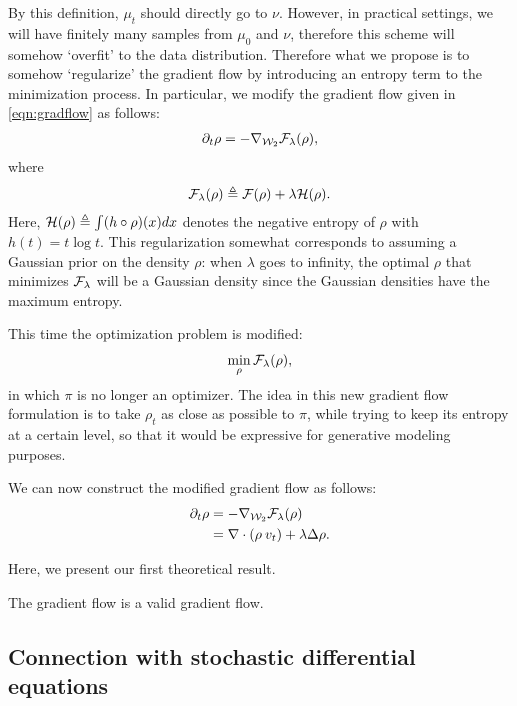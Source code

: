 By this definition, $\mu_t$ should directly go to $\nu$. However, in practical settings, we will have finitely many samples from $\mu_0$ and $\nu$, therefore this scheme will somehow `overfit' to the data distribution. Therefore what we propose is to somehow `regularize' the gradient flow by introducing an entropy term to the minimization process. In particular, we modify the gradient flow given in \eqref{eqn:gradflow} as follows:
\begin{align}
\partial_t \rho = - \nabla_{{\cal W}_2} {\cal F}_\lambda(\rho),
\end{align}
where
\begin{align}
{\cal F}_\lambda(\rho) \triangleq {\cal F}(\rho) + \lambda {\cal H}(\rho).
\end{align}
Here, ${\cal H}(\rho) \triangleq \int (h \circ \rho) (x) dx $ denotes the negative entropy of $\rho$ with $h(t) = t \log t$. This regularization somewhat corresponds to assuming a Gaussian prior on the density $\rho$: when $\lambda$ goes to infinity, the optimal $\rho$ that minimizes ${\cal F}_\lambda$ will be a Gaussian density since the Gaussian densities have the maximum entropy.

This time the optimization problem is modified:
\begin{align}
\min_\rho {\cal F}_\lambda(\rho),
\end{align}
in which $\pi$ is no longer an optimizer. The idea in this new gradient flow formulation is to take $\rho_t$ as close as possible to $\pi$, while trying to keep its entropy at a certain level, so that it would be expressive for generative modeling purposes.

We can now construct the modified gradient flow as follows:
\begin{align}
\partial_t \rho &= - \nabla_{{\cal W}_2} {\cal F}_\lambda(\rho) \\
&=  \nabla \cdot (\rho \> v_t) + \lambda \Delta \rho. \label{eqn:gradflow_reg}
\end{align}

Here, we present our first theoretical result. 
\begin{thm}
The gradient flow is a valid gradient flow. 
\end{thm}


\subsection{Connection with stochastic differential equations}

